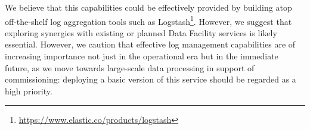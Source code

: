 We believe that this capabilities could be effectively provided by building
atop off-the-shelf log aggregation tools such as
Logstash\footnote{\url{https://www.elastic.co/products/logstash}}. However, we
suggest that exploring synergies with existing or planned Data Facility
services is likely essential. However, we caution that effective log management
capabilities are of increasing importance not just in the operational era but
in the immediate future, as we move towards large-scale data processing in
support of commissioning: deploying a basic version of this service should be
regarded as a high priority.
